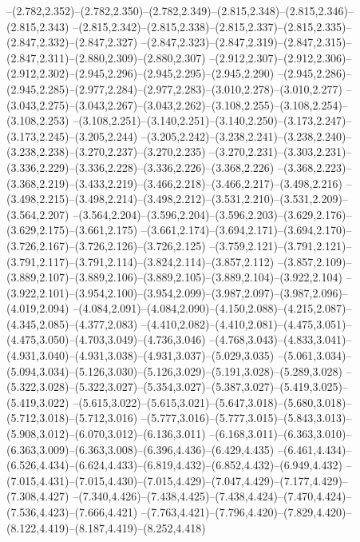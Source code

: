   --(2.782,2.352)--(2.782,2.350)--(2.782,2.349)--(2.815,2.348)--(2.815,2.346)--(2.815,2.343)%
  --(2.815,2.342)--(2.815,2.338)--(2.815,2.337)--(2.815,2.335)--(2.847,2.332)--(2.847,2.327)%
  --(2.847,2.323)--(2.847,2.319)--(2.847,2.315)--(2.847,2.311)--(2.880,2.309)--(2.880,2.307)%
  --(2.912,2.307)--(2.912,2.306)--(2.912,2.302)--(2.945,2.296)--(2.945,2.295)--(2.945,2.290)%
  --(2.945,2.286)--(2.945,2.285)--(2.977,2.284)--(2.977,2.283)--(3.010,2.278)--(3.010,2.277)%
  --(3.043,2.275)--(3.043,2.267)--(3.043,2.262)--(3.108,2.255)--(3.108,2.254)--(3.108,2.253)%
  --(3.108,2.251)--(3.140,2.251)--(3.140,2.250)--(3.173,2.247)--(3.173,2.245)--(3.205,2.244)%
  --(3.205,2.242)--(3.238,2.241)--(3.238,2.240)--(3.238,2.238)--(3.270,2.237)--(3.270,2.235)%
  --(3.270,2.231)--(3.303,2.231)--(3.336,2.229)--(3.336,2.228)--(3.336,2.226)--(3.368,2.226)%
  --(3.368,2.223)--(3.368,2.219)--(3.433,2.219)--(3.466,2.218)--(3.466,2.217)--(3.498,2.216)%
  --(3.498,2.215)--(3.498,2.214)--(3.498,2.212)--(3.531,2.210)--(3.531,2.209)--(3.564,2.207)%
  --(3.564,2.204)--(3.596,2.204)--(3.596,2.203)--(3.629,2.176)--(3.629,2.175)--(3.661,2.175)%
  --(3.661,2.174)--(3.694,2.171)--(3.694,2.170)--(3.726,2.167)--(3.726,2.126)--(3.726,2.125)%
  --(3.759,2.121)--(3.791,2.121)--(3.791,2.117)--(3.791,2.114)--(3.824,2.114)--(3.857,2.112)%
  --(3.857,2.109)--(3.889,2.107)--(3.889,2.106)--(3.889,2.105)--(3.889,2.104)--(3.922,2.104)%
  --(3.922,2.101)--(3.954,2.100)--(3.954,2.099)--(3.987,2.097)--(3.987,2.096)--(4.019,2.094)%
  --(4.084,2.091)--(4.084,2.090)--(4.150,2.088)--(4.215,2.087)--(4.345,2.085)--(4.377,2.083)%
  --(4.410,2.082)--(4.410,2.081)--(4.475,3.051)--(4.475,3.050)--(4.703,3.049)--(4.736,3.046)%
  --(4.768,3.043)--(4.833,3.041)--(4.931,3.040)--(4.931,3.038)--(4.931,3.037)--(5.029,3.035)%
  --(5.061,3.034)--(5.094,3.034)--(5.126,3.030)--(5.126,3.029)--(5.191,3.028)--(5.289,3.028)%
  --(5.322,3.028)--(5.322,3.027)--(5.354,3.027)--(5.387,3.027)--(5.419,3.025)--(5.419,3.022)%
  --(5.615,3.022)--(5.615,3.021)--(5.647,3.018)--(5.680,3.018)--(5.712,3.018)--(5.712,3.016)%
  --(5.777,3.016)--(5.777,3.015)--(5.843,3.013)--(5.908,3.012)--(6.070,3.012)--(6.136,3.011)%
  --(6.168,3.011)--(6.363,3.010)--(6.363,3.009)--(6.363,3.008)--(6.396,4.436)--(6.429,4.435)%
  --(6.461,4.434)--(6.526,4.434)--(6.624,4.433)--(6.819,4.432)--(6.852,4.432)--(6.949,4.432)%
  --(7.015,4.431)--(7.015,4.430)--(7.015,4.429)--(7.047,4.429)--(7.177,4.429)--(7.308,4.427)%
  --(7.340,4.426)--(7.438,4.425)--(7.438,4.424)--(7.470,4.424)--(7.536,4.423)--(7.666,4.421)%
  --(7.763,4.421)--(7.796,4.420)--(7.829,4.420)--(8.122,4.419)--(8.187,4.419)--(8.252,4.418)%
